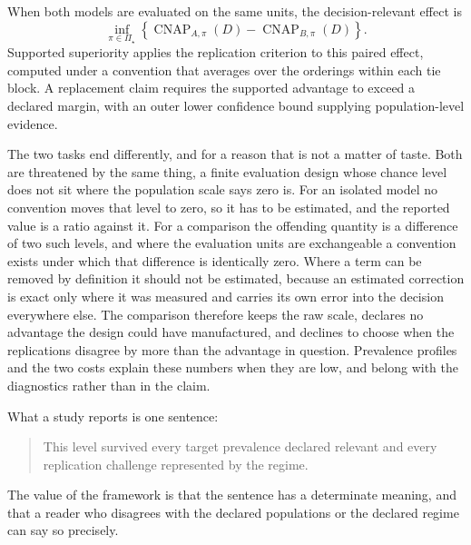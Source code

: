 \documentclass[11pt]{article}
\newcommand{\CNAP}{\operatorname{CNAP}}
\newcommand{\PSet}{\Pi_\star}
\theoremstyle{remark}
\begin{document}
When both models are evaluated on the same units, the decision-relevant effect is
\[
\inf_{\pi\in\PSet}
\left\{
\CNAP_{A,\pi}(D)-\CNAP_{B,\pi}(D)
\right\}.
\]
Supported superiority applies the replication criterion to this paired effect, computed under a convention that averages over the orderings within each tie block. A replacement claim requires the supported advantage to exceed a declared margin, with an outer lower confidence bound supplying population-level evidence.

The two tasks end differently, and for a reason that is not a matter of taste. Both are threatened by the same thing, a finite evaluation design whose chance level does not sit where the population scale says zero is. For an isolated model no convention moves that level to zero, so it has to be estimated, and the reported value is a ratio against it. For a comparison the offending quantity is a difference of two such levels, and where the evaluation units are exchangeable a convention exists under which that difference is identically zero. Where a term can be removed by definition it should not be estimated, because an estimated correction is exact only where it was measured and carries its own error into the decision everywhere else. The comparison therefore keeps the raw scale, declares no advantage the design could have manufactured, and declines to choose when the replications disagree by more than the advantage in question. Prevalence profiles and the two costs explain these numbers when they are low, and belong with the diagnostics rather than in the claim.

What a study reports is one sentence:

\begin{quote}
This level survived every target prevalence declared relevant and every replication challenge represented by the regime.
\end{quote}

The value of the framework is that the sentence has a determinate meaning, and that a reader who disagrees with the declared populations or the declared regime can say so precisely.
\end{document}
